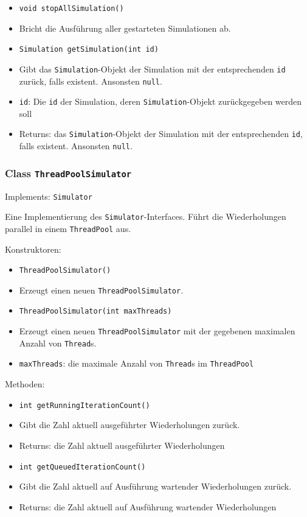 \documentclass[parskip=full,11pt]{scrartcl}
\begin{document}
\begin{itemize}
\item \texttt{void stopAllSimulation()}
\item[] Bricht die Ausführung aller gestarteten Simulationen ab.

\item \texttt{Simulation getSimulation(int id)}
\item[] Gibt das \texttt{Simulation}-Objekt der Simulation mit der entsprechenden \texttt{id} zurück, falls existent. Ansonsten \texttt{null}.
\item[] \texttt{id}: Die \texttt{id} der Simulation, deren \texttt{Simulation}-Objekt zurückgegeben werden soll
\item[] Returns: das \texttt{Simulation}-Objekt der Simulation mit der entsprechenden \texttt{id}, falls existent. Ansonsten \texttt{null}.
\end{itemize}

\subsubsection{Class \texttt{ThreadPoolSimulator}}
Implements: \texttt{Simulator}

Eine Implementierung des \texttt{Simulator}-Interfaces. Führt die Wiederholungen parallel in einem \texttt{ThreadPool} aus.

Konstruktoren:
\begin{itemize}\itemsep -10pt
\item \texttt{ThreadPoolSimulator()}
\item[] Erzeugt einen neuen \texttt{ThreadPoolSimulator}.

\item \texttt{ThreadPoolSimulator(int maxThreads)}
\item[] Erzeugt einen neuen \texttt{ThreadPoolSimulator} mit der gegebenen maximalen Anzahl von \texttt{Thread}s.
\item[] \texttt{maxThreads}: die maximale Anzahl von \texttt{Thread}s im \texttt{ThreadPool}
\end{itemize}

Methoden:
\begin{itemize}\itemsep -10pt
\item \texttt{int getRunningIterationCount()}
\item[] Gibt die Zahl aktuell ausgeführter Wiederholungen zurück.
\item[] Returns: die Zahl aktuell ausgeführter Wiederholungen

\item \texttt{int getQueuedIterationCount()}
\item[] Gibt die Zahl aktuell auf Ausführung wartender Wiederholungen zurück.
\item[] Returns: die Zahl aktuell auf Ausführung wartender Wiederholungen
\end{itemize}
\end{document}
